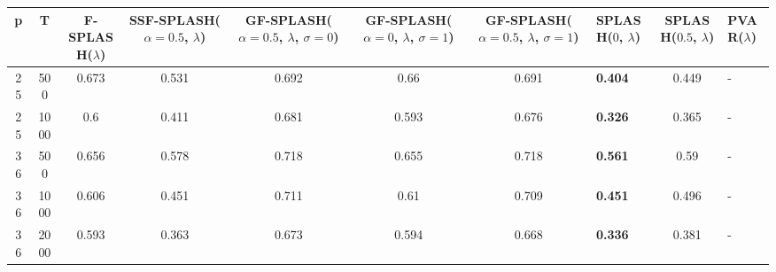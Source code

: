 \begin{tabular}{ccccccclcl}
\hline
  p  &  T   &  F-SPLASH($\lambda$)  &  SSF-SPLASH($\alpha=0.5$, $\lambda$)  &  GF-SPLASH($\alpha=0.5$, $\lambda$, $\sigma=0$)  &  GF-SPLASH($\alpha=0$, $\lambda$, $\sigma=1$)  &  GF-SPLASH($\alpha=0.5$, $\lambda$, $\sigma=1$)  & SPLASH($0$, $\lambda$)   &  SPLASH($0.5$, $\lambda$)  & PVAR($\lambda$)   \\
\hline
 25  & 500  &         0.673         &                 0.531                 &                      0.692                       &                      0.66                      &                      0.691                       & \textbf{0.404}           &           0.449            & -                 \\
 25  & 1000 &          0.6          &                 0.411                 &                      0.681                       &                     0.593                      &                      0.676                       & \textbf{0.326}           &           0.365            & -                 \\
 36  & 500  &         0.656         &                 0.578                 &                      0.718                       &                     0.655                      &                      0.718                       & \textbf{0.561}           &            0.59            & -                 \\
 36  & 1000 &         0.606         &                 0.451                 &                      0.711                       &                      0.61                      &                      0.709                       & \textbf{0.451}           &           0.496            & -                 \\
 36  & 2000 &         0.593         &                 0.363                 &                      0.673                       &                     0.594                      &                      0.668                       & \textbf{0.336}           &           0.381            & -                 \\
\hline
\end{tabular}